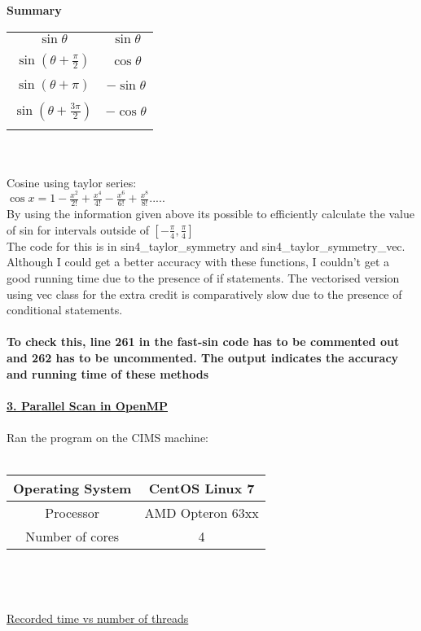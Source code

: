 \documentclass[12pt,letterpaper]{article}
\begin{document}
\textbf{Summary} \\
\begin{tabular}{ |c|c| } 
 \hline
 $\sin{\theta}$ &  $\sin{\theta}$ \\
  & \\
 \hline
 $\sin{(\theta + \frac{\pi}{2})}$ &  $\cos{\theta}$\\
  & \\
 \hline
  $\sin{(\theta + \pi)}$& $ -\sin{\theta}$  \\ 
   & \\
 \hline 
 $\sin{(\theta + \frac{3\pi}{2})}$ & $ -\cos{\theta}$ \\
 & \\
\hline

\end{tabular}
\\\\

Cosine using taylor series: \\
$\cos{x} = 1 - \frac{x^2}{2!} + \frac{x^4}{4!} - \frac{x^6}{6!} + \frac{x^8}{8!} .....   $ \\
By using the information given above its possible to efficiently calculate the value of sin for intervals outside of $[-\frac{\pi}{4} , \frac{\pi}{4}]$ \\

The code for this is in sin4\_taylor\_symmetry and sin4\_taylor\_symmetry\_vec.  \\
Although I could get a better accuracy with these functions, I couldn't get a good running time due to the presence of if statements. The vectorised version using vec class for the extra credit is comparatively slow due to the presence of conditional statements. \\\\
\textbf{To check this, line 261 in the fast-sin code has to be commented out and 262 has to be uncommented. The output indicates the accuracy and running time of these methods} \\\\
\newpage
\underline{\textbf{3. Parallel Scan in OpenMP}} \\\\
Ran the program on the CIMS machine:  \\\\
\begin{tabular}{ |c|c| } 
 \hline
 Operating System & CentOS Linux 7  \\
 \hline
 Processor & AMD Opteron 63xx\\
 \hline
 
 Number of cores & 4\\
 \hline
\end{tabular} \\\\\\
\underline{Recorded time vs number of threads} \\\\
\end{document}
